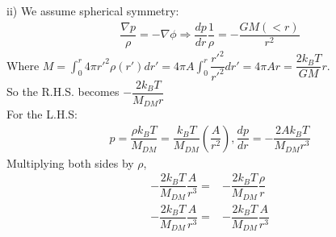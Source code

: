 \documentclass[a4paper]{article}
\begin{document}
\noindent ii) We assume spherical symmetry:
\begin{align*}
\dfrac{\nabla p}{\rho} = - \nabla \phi
\Rightarrow \dfrac{dp}{dr}\dfrac{1}{\rho} = -\dfrac{GM(<r)}{r^2}
\end{align*}
Where $M = \int_0^r 4 \pi r'^2 \rho(r')dr' = 4 \pi A \int_0^r \dfrac{r'^2}{r'^2}dr' = 4 \pi A r = \dfrac{2k_BT}{GM}r$.\\ So the R.H.S. becomes $-\dfrac{2k_BT}{M_{DM}r}$ \\
\clearpage
\noindent For the L.H.S:
\begin{align*}
p = \dfrac{\rho k_BT}{M_{DM}} = \dfrac{k_BT}{M_{DM}}(\dfrac{A}{r^2}),
\dfrac{dp}{dr} = -\dfrac{2Ak_BT}{M_{DM}r^3}
\end{align*}
Multiplying both sides by $\rho$,
\begin{align*}
-\dfrac{2k_BT}{M_{DM}}\dfrac{A}{r^3} =& - \dfrac{2k_BT}{M_{DM}}\dfrac{\rho}{r}\\
-\dfrac{2k_BT}{M_{DM}}\dfrac{A}{r^3} =& -\dfrac{2k_BT}{M_{DM}}\dfrac{A}{r^3}
\end{align*}
\end{document}
